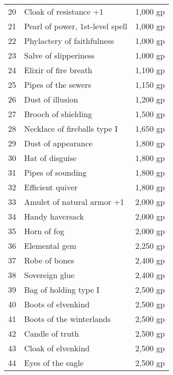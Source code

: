 \begin{table}[]
\begin{tabular}{lll}
20  & Cloak of resistance +1                      & 1,000 gp     \\
21  & Pearl of power, 1st-level spell             & 1,000 gp     \\
22  & Phylactery of faithfulness                  & 1,000 gp     \\
23  & Salve of slipperiness                       & 1,000 gp     \\
24  & Elixir of fire breath                       & 1,100 gp     \\
25  & Pipes of the sewers                         & 1,150 gp     \\
26  & Dust of illusion                            & 1,200 gp     \\
27  & Brooch of shielding                         & 1,500 gp     \\
28  & Necklace of fireballs type I                & 1,650 gp     \\
29  & Dust of appearance                          & 1,800 gp     \\
30  & Hat of disguise                             & 1,800 gp     \\
31  & Pipes of sounding                           & 1,800 gp     \\
32  & Efficient quiver                            & 1,800 gp     \\
33  & Amulet of natural armor +1                  & 2,000 gp     \\
34  & Handy haversack                             & 2,000 gp     \\
35  & Horn of fog                                 & 2,000 gp     \\
36  & Elemental gem                               & 2,250 gp     \\
37  & Robe of bones                               & 2,400 gp     \\
38  & Sovereign glue                              & 2,400 gp     \\
39  & Bag of holding type I                       & 2,500 gp     \\
40  & Boots of elvenkind                          & 2,500 gp     \\
41  & Boots of the winterlands                    & 2,500 gp     \\
42  & Candle of truth                             & 2,500 gp     \\
43  & Cloak of elvenkind                          & 2,500 gp     \\
44  & Eyes of the eagle                           & 2,500 gp     \\

\end{tabular}
\end{table}
